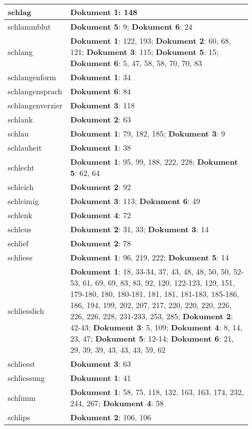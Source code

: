 \documentclass[a5paper]{article}
\begin{document}
\begin{longtable}[l]{|l|p{3in}|}
\hline
schlag & \textbf{Dokument 1}: 148 \\
\hline
schlammblut & \textbf{Dokument 5}: 9; \textbf{Dokument 6}: 24 \\
\hline
schlang & \textbf{Dokument 1}: 122, 193; \textbf{Dokument 2}: 60, 68, 121; \textbf{Dokument 3}: 115; \textbf{Dokument 5}: 15; \textbf{Dokument 6}: 5, 47, 58, 58, 70, 70, 83 \\
\hline
schlangenform & \textbf{Dokument 1}: 34 \\
\hline
schlangensprach & \textbf{Dokument 6}: 84 \\
\hline
schlangenverzier & \textbf{Dokument 3}: 118 \\
\hline
schlank & \textbf{Dokument 2}: 63 \\
\hline
schlau & \textbf{Dokument 1}: 79, 182, 185; \textbf{Dokument 3}: 9 \\
\hline
schlauheit & \textbf{Dokument 1}: 38 \\
\hline
schlecht & \textbf{Dokument 1}: 95, 99, 188, 222, 228; \textbf{Dokument 5}: 62, 64 \\
\hline
schleich & \textbf{Dokument 2}: 92 \\
\hline
schleimig & \textbf{Dokument 3}: 113; \textbf{Dokument 6}: 49 \\
\hline
schlenk & \textbf{Dokument 4}: 72 \\
\hline
schleus & \textbf{Dokument 2}: 31, 33; \textbf{Dokument 3}: 14 \\
\hline
schlief & \textbf{Dokument 2}: 78 \\
\hline
schliess & \textbf{Dokument 1}: 96, 219, 222; \textbf{Dokument 5}: 14 \\
\hline
schliesslich & \textbf{Dokument 1}: 18, 33-34, 37, 43, 48, 48, 50, 50, 52-53, 61, 69, 69, 83, 83, 92, 120, 122-123, 129, 151, 179-180, 180, 180-181, 181, 181, 181-183, 185-186, 186, 194, 199, 202, 207, 217, 220, 220, 220, 226, 226, 226, 228, 231-233, 253, 285; \textbf{Dokument 2}: 42-43; \textbf{Dokument 3}: 5, 109; \textbf{Dokument 4}: 8, 14, 23, 47; \textbf{Dokument 5}: 12-14; \textbf{Dokument 6}: 21, 29, 39, 39, 43, 43, 43, 59, 62 \\
\hline
schliesst & \textbf{Dokument 3}: 63 \\
\hline
schliessung & \textbf{Dokument 1}: 41 \\
\hline
schlimm & \textbf{Dokument 1}: 58, 75, 118, 132, 163, 163, 174, 232, 244, 267; \textbf{Dokument 4}: 58 \\
\hline
schlips & \textbf{Dokument 2}: 106, 106 \\

\end{longtable}
\end{document}

